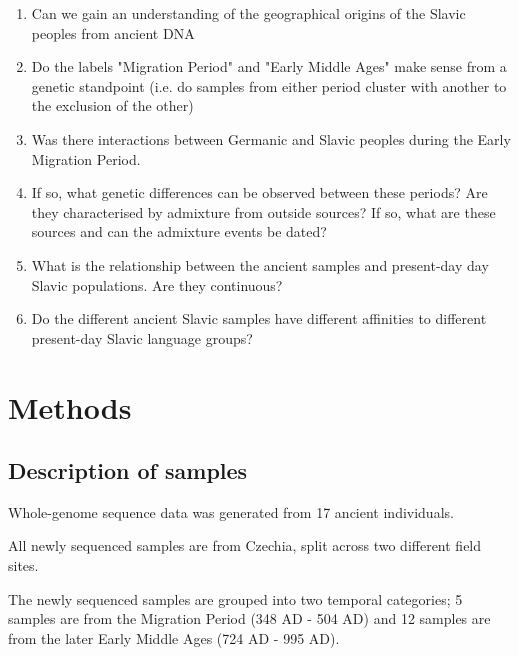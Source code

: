 \begin{enumerate}
\item Can we gain an understanding of the geographical origins of the Slavic peoples from ancient DNA
\item Do the labels "Migration Period" and "Early Middle Ages" make sense from a genetic standpoint (i.e. do samples from either period cluster with another to the exclusion of the other)
\item Was there interactions between Germanic and Slavic peoples during the Early Migration Period. 
\item If so, what genetic differences can be observed between these periods? Are they characterised by admixture from outside sources? If so, what are these sources and can the admixture events be dated?
\item What is the relationship between the ancient samples and present-day day Slavic populations. Are they continuous?
\item Do the different ancient Slavic samples have different affinities to different present-day Slavic language groups?
\end{enumerate}


\section{Methods}

\subsection{Description of samples}

Whole-genome sequence data was generated from 17 ancient individuals. 

All newly sequenced samples are from Czechia, split across two different field sites. 

The newly sequenced samples are grouped into two temporal categories; 5 samples are from the Migration Period (348 AD - 504 AD) and 12 samples are from the later Early Middle Ages (724 AD - 995 AD). 

